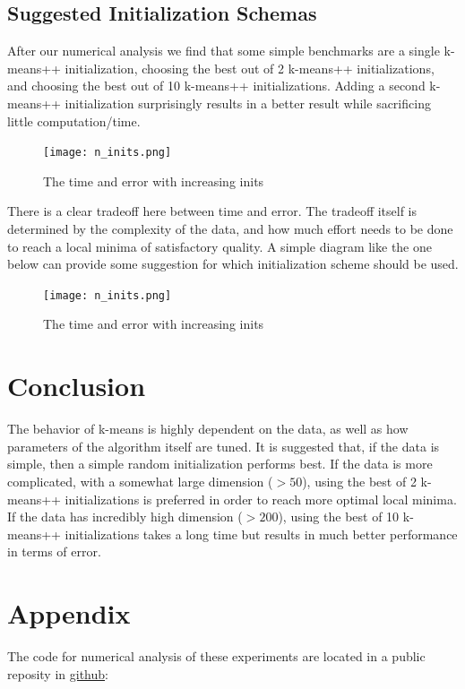 \documentclass{article}
\begin{document}
\subsection{Suggested Initialization Schemas}
After our numerical analysis we find that some simple benchmarks are a single k-means++ initialization, choosing the best out of 2 k-means++ initializations, and choosing the best out of 10 k-means++ initializations. Adding a second k-means++ initialization surprisingly results in a better result while sacrificing little computation/time.

\begin{figure}[!ht]
  \centering
  \texttt{[image: n\_inits.png]}
  \caption{The time and error with increasing inits}
\end{figure}

There is a clear tradeoff here between time and error. The tradeoff itself is determined by the complexity of the data, and how much effort needs to be done to reach a local minima of satisfactory quality. A simple diagram like the one below can provide some suggestion for which initialization scheme should be used.

\begin{figure}[!ht]
  \centering
  \texttt{[image: n\_inits.png]}
  \caption{The time and error with increasing inits}
\end{figure}

\section{Conclusion}
The behavior of k-means is highly dependent on the data, as well as how parameters of the algorithm itself are tuned. It is suggested that, if the data is simple, then a simple random initialization performs best. If the data is more complicated, with a somewhat large dimension ($>50$), using the best of 2 k-means++ initializations is preferred in order to reach more optimal local minima. If the data has incredibly high dimension ($>200$), using the best of 10 k-means++ initializations takes a long time but results in much better performance in terms of error.

\section{Appendix}
The code for numerical analysis of these experiments are located in a public reposity in \hyperlink{http://github.com/wow}{github}: 
\end{document}

